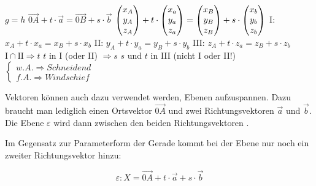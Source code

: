 \begin{center}
  $ g = h$
  \extrapar
  $ \vec{0A} + t \cdot \vec{a} = \vec{0B} + s \cdot \vec{b}$
  \extrapar
  $ \begin{pmatrix}x_{A}\\y_{A}\\z_{A}\end{pmatrix} + t \cdot \begin{pmatrix}x_{a}\\y_{a}\\z_{a}\end{pmatrix} = \begin{pmatrix}x_{B}\\y_{B}\\z_{B}\end{pmatrix} + s\cdot \begin{pmatrix}x_{b}\\y_{b}\\z_{b}\end{pmatrix}$
  \extrapar
  I: $x_{A} + t \cdot x_{a} = x_{B} + s \cdot x_{b}$
  \extrapar
  II: $y_{A} + t \cdot y_{a} = y_{B} + s \cdot y_{b}$
  \extrapar
  III: $z_{A} + t \cdot z_{a} = z_{B} + s \cdot z_{b}$
  \extrapar
  $\text{I} \cap \text{II} \Rightarrow t$
  \extrapar
  $t$ in I (oder II) $\Rightarrow s$
  \extrapar
  $s$ und $t$ in III (nicht I oder II!)
  $
  \begin{cases}
    w.A. \Rightarrow Schneidend\\
    f.A. \Rightarrow Windschief
  \end{cases}
  $
\end{center}

\pagebreak


Vektoren k\"{o}nnen auch dazu verwendet werden, Ebenen aufzuspannen. Dazu braucht man lediglich einen Ortsvektor $\vec{0A}$ und zwei Richtungsvektoren $\vec{a}$ und $\vec{b}$. Die Ebene $\varepsilon$ wird dann zwischen den beiden Richtungsvektoren .

\begin{figure}[h!]
  \centering
  \large
\end{figure}


Im Gegensatz zur Parameterform der Gerade kommt bei der Ebene nur noch ein zweiter Richtungsvektor hinzu:

$$\varepsilon: X = \vec{0A} + t \cdot \vec{a} + s \cdot \vec{b}$$


